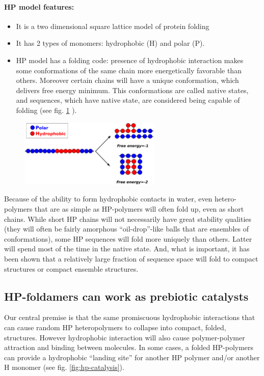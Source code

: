 \documentclass[12pt]{paper}
\begin{document}
\paragraph{HP model features:} 
\begin{itemize}
 \item It is a two dimensional square lattice model of protein folding
 \item It has 2 types of monomers: hydrophobic (H) and polar (P). 
 \item HP model has a folding code: presence of hydrophobic interaction makes some conformations 
of the same chain more energetically favorable than others. Moreover certain chains will have a 
unique conformation, which delivers free energy minimum. This conformations are called native 
states, and sequences, which have native state, are considered being capable of folding (see fig. 
\ref{fig:hp-model} ).
\end{itemize}

\begin{figure}[h!]
  \centering
  \includegraphics[width=0.6\textwidth]{pictures/hp-model.pdf} 
  \caption{}
  \label{fig:hp-model}
\end{figure}
Because of the ability to form hydrophobic contacts in water, even hetero-polymers that 
are as simple as HP-polymers will often fold up, even as short chains. 
While short HP chains will not necessarily have great stability qualities (they will often be 
fairly amorphous ``oil-drop''-like balls that are ensembles of conformations), some HP 
sequences will fold more uniquely than others. Latter will spend most of the time in the native 
state. And, what is important, it has been shown that a 
relatively large fraction of sequence space will fold to compact structures or compact ensemble 
structures\cite{lau1989lattice}.

\subsection{HP-foldamers can work as prebiotic catalysts}
Our central premise is that the same promiscuous hydrophobic interactions that can cause random 
HP heteropolymers to collapse into compact, folded, structures. However hydrophobic 
interaction will also cause polymer-polymer attraction and binding between molecules.  In some 
cases, a folded HP-polymers can provide a hydrophobic ``landing site'' for another HP polymer 
and/or another H monomer (see fig. \ref{fig:hp-catalysis}).  
\end{document}

